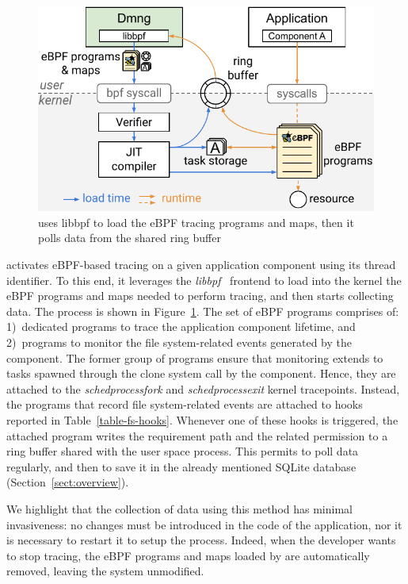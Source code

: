 \begin{figure}[t!]
  \centering
  \includegraphics[width=0.7\columnwidth]{chapters/dmng/fig/ebpf_overview.pdf}
  \caption[Architecture of the eBPF-based instrumentation]{\dmng uses
    libbpf to load the eBPF tracing programs and maps, then it polls
    data from the shared ring buffer}
  \label{fig:ebpf}
\end{figure}

\dmng activates eBPF-based tracing on a given application component
using its thread identifier. To this end, it leverages the {\em
  libbpf}~\cite{libbpf-doc} frontend to load into the kernel the eBPF
programs and maps needed to perform tracing, and then starts
collecting data. The process is shown in Figure~\ref{fig:ebpf}.  The
set of eBPF programs comprises of: 1)~dedicated programs to trace the
application component lifetime, and 2)~programs to monitor the file
system-related events generated by the component. The former group of
programs ensure that monitoring extends to tasks spawned through the
clone system call by the component. Hence, they are attached to the
{\em sched\textunderscore process\textunderscore fork} and {\em
  sched\textunderscore process\textunderscore exit} kernel
tracepoints. Instead, the programs that record file system-related
events are attached to hooks reported in
Table~\ref{table-fs-hooks}. Whenever one of these hooks is triggered,
the attached program writes the requirement path and the related
permission to a ring buffer shared with the \dmng user space
process. This permits \dmng to poll data regularly, and then to save it
in the already mentioned SQLite database
(Section~\ref{sect:overview}).

We highlight that the collection of data using this method has minimal
invasiveness: no changes must be introduced in the code of the
application, nor it is necessary to restart it to setup the process.
Indeed, when the developer wants to stop tracing, the eBPF programs
and maps loaded by \dmng are automatically removed, leaving the system
unmodified.

